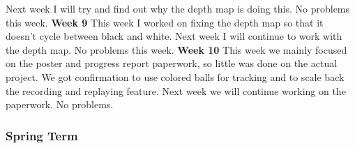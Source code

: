 \documentclass[onecolumn, draftclsnofoot,10pt, compsoc]{IEEEtran}
\begin{document}
\newline
Next week I will try and find out why the depth map is doing this.
\newline
No problems this week.
\newline
\textbf{Week 9}
\newline
This week I worked on fixing the depth map so that it doesn't cycle between black and white.
\newline
Next week I will continue to work with the depth map.
\newline
No problems this week.
\newline
\textbf{Week 10}
\newline
This week we mainly focused on the poster and progress report paperwork, so little was done on the actual project. We got confirmation to use colored balls for tracking and to scale back the recording and replaying feature.
\newline
Next week we will continue working on the paperwork.
\newline
No problems.

\subsubsection{Spring Term}
\end{document}
